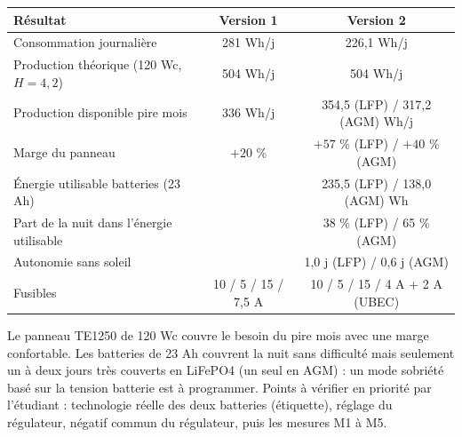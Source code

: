 \documentclass[11pt,a4paper]{article}
\begin{document}
\begin{center}
\begin{tabular}{l c c}
\toprule
\textbf{Résultat} & \textbf{Version 1} & \textbf{Version 2} \\
\midrule
Consommation journalière & 281 Wh/j & 226,1 Wh/j \\
Production théorique (120 Wc, $H = 4{,}2$) & 504 Wh/j & 504 Wh/j \\
Production disponible pire mois & 336 Wh/j & 354,5 (LFP) / 317,2 (AGM) Wh/j \\
Marge du panneau & $+20$ \% & $+57$ \% (LFP) / $+40$ \% (AGM) \\
Énergie utilisable batteries (23 Ah) & & 235,5 (LFP) / 138,0 (AGM) Wh \\
Part de la nuit dans l'énergie utilisable & & 38 \% (LFP) / 65 \% (AGM) \\
Autonomie sans soleil & & 1,0 j (LFP) / 0,6 j (AGM) \\
Fusibles & 10 / 5 / 15 / 7,5 A & 10 / 5 / 15 / 4 A + 2 A (UBEC) \\
\bottomrule
\end{tabular}
\end{center}

\begin{resume}
Le panneau TE1250 de 120 Wc couvre le besoin du pire mois avec une marge confortable. Les batteries de 23 Ah couvrent la nuit sans difficulté mais seulement un à deux jours très couverts en LiFePO4 (un seul en AGM) : un mode sobriété basé sur la tension batterie est à programmer. Points à vérifier en priorité par l'étudiant : technologie réelle des deux batteries (étiquette), réglage du régulateur, négatif commun du régulateur, puis les mesures M1 à M5.
\end{resume}
\end{document}

